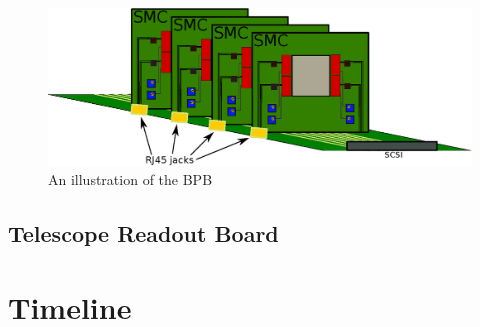\documentclass{article}
\begin{document}
\begin{figure}[h!]
  \centering
  \includegraphics{./figures/BPB.eps}
  \caption{An illustration of the BPB}
  \label{fig:PBP}
\end{figure}

\subsection{Telescope Readout Board}

\section{Timeline}

\newpage



\glsaddall
\printglossaries
\end{document}
